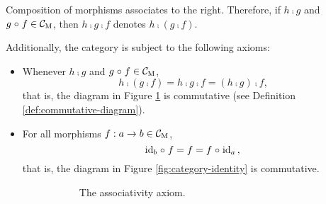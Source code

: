 \begin{definition}
\begin{itemize}
    Composition of morphisms associates to the right. Therefore, if $h
    \comp g$ and $g \mathrel{\circ} f \in \mathcal{C}_{\operatorname{M}}$, then $h \comp g \comp f$
    denotes $h \comp (g \comp f)$.

  \end{itemize}
  Additionally, the category  is subject to the following
  axioms:
  \begin{itemize}
  \item

    Whenever $h \comp g$ and $g \mathrel{\circ} f \in \mathcal{C}_{\operatorname{M}}$,
    \begin{equation}
      \label{eq:category-associativity}
      h \comp (g \comp f) = h \comp g \comp f = (h \comp g) \comp f
      \text{,}
    \end{equation}
    that is, the diagram in Figure \ref{fig:category-associativity} is
    commutative (see Definition \ref{def:commutative-diagram}).

  \item

    For all morphisms $f: a \to b \in \mathcal{C}_{\operatorname{M}}$,
    \begin{equation}
      \label{eq:category-identity}
      \operatorname{id}_{b} \mathrel{\circ} f = f = f \mathrel{\circ} \operatorname{id}_{a}
      \text{,}
    \end{equation}
    that is, the diagram in Figure \ref{fig:category-identity} is
    commutative.

    \begin{figure}
      \begin{subfigure}[b]{0.5\linewidth}
        \begin{center}
        \end{center}
        \caption{The associativity axiom.}
        \label{fig:category-associativity}
      \end{subfigure}
      \begin{subfigure}[b]{0.5\linewidth}
        \begin{center}
\end{center}
\end{subfigure}
\end{figure}
\end{itemize}
\end{definition}
